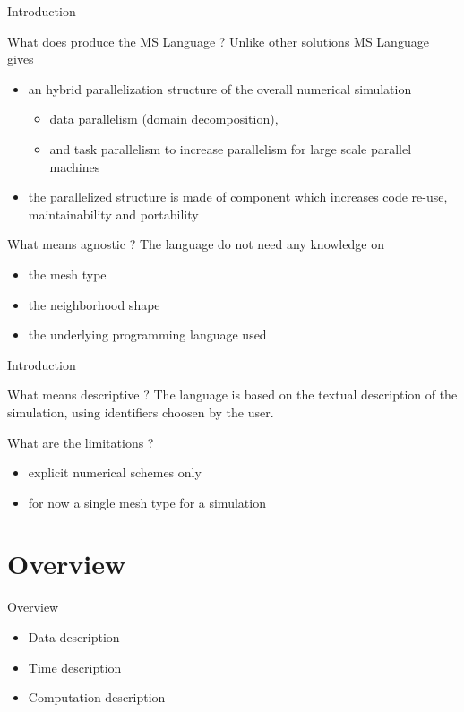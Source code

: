 \documentclass{beamer}
\begin{document}
\begin{frame}{Introduction}
\begin{block}{What does produce the MS Language ?}
Unlike other solutions MS Language gives
\begin{itemize}
\item an hybrid parallelization structure of the overall numerical simulation
\begin{itemize}
\item data parallelism (domain decomposition),
\item and task parallelism to increase parallelism for large scale parallel machines
\end{itemize}
\item the parallelized structure is made of component which increases code re-use, maintainability and portability
\end{itemize}
\end{block}

\begin{block}{What means agnostic ?}
The language do not need any knowledge on
\begin{itemize}
\item the mesh type
\item the neighborhood shape
\item the underlying programming language used
\end{itemize}
\end{block}
\end{frame}

\begin{frame}{Introduction}
\begin{block}{What means descriptive ?}
The language is based on the textual description of the simulation, using identifiers choosen by the user.
\end{block}

\begin{block}{What are the limitations ?}
\begin{itemize}
\item explicit numerical schemes only
\item for now a single mesh type for a simulation
\end{itemize}
\end{block}
\end{frame}

\section{Overview}
\begin{frame}{Overview}
\begin{itemize}
\item Data description
\item Time description
\item Computation description
\end{itemize}
\end{frame}
\end{document}
